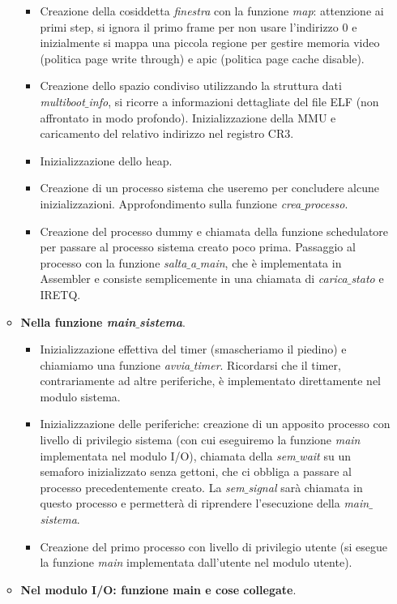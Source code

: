 \begin{itemize}
\begin{itemize}
\begin{itemize}
			\item Creazione della cosiddetta \emph{finestra} con la funzione \emph{map}: attenzione ai primi step, si ignora il primo frame per non usare l'indirizzo $0$ e inizialmente si mappa una piccola regione per gestire memoria video (politica page write through) e apic (politica page cache disable).
			\item Creazione dello spazio condiviso utilizzando la struttura dati \emph{multiboot$\_$info}, si ricorre a informazioni dettagliate del file ELF (non affrontato in modo profondo). Inizializzazione della MMU e caricamento del relativo indirizzo nel registro CR3.
			\item Inizializzazione dello heap.
			\item Creazione di un processo sistema che useremo per concludere alcune inizializzazioni. Approfondimento sulla funzione \emph{crea$\_$processo}.
			\item Creazione del processo dummy e chiamata della funzione schedulatore per passare al processo sistema creato poco prima. Passaggio al processo con la funzione \emph{salta$\_$a$\_$main}, che è implementata in Assembler e consiste semplicemente in una chiamata di \emph{carica$\_$stato} e IRETQ.
		\end{itemize}
		\item \textbf{Nella funzione \emph{main$\_$sistema}}.
		\begin{itemize}
			\item Inizializzazione effettiva del timer (smascheriamo il piedino) e chiamiamo una funzione \emph{avvia$\_$timer}. Ricordarsi che il timer, contrariamente ad altre periferiche, è implementato direttamente nel modulo sistema.
			\item Inizializzazione delle periferiche: creazione di un apposito processo con livello di privilegio sistema (con cui eseguiremo la funzione \emph{main} implementata nel modulo I/O), chiamata della \emph{sem$\_$wait} su un semaforo inizializzato senza gettoni, che ci obbliga a passare al processo precedentemente creato. La \emph{sem$\_$signal} sarà chiamata in questo processo e permetterà di riprendere l'esecuzione della \emph{main$\_$sistema}.
			\item Creazione del primo processo con livello di privilegio utente (si esegue la funzione \emph{main} implementata dall'utente nel modulo utente).
		\end{itemize}
		\item \textbf{Nel modulo I/O: funzione main e cose collegate}.
		\begin{itemize}

\end{itemize}
\end{itemize}
\end{itemize}
